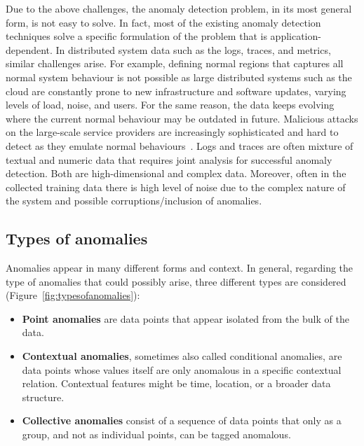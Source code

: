 Due to the above challenges, the anomaly detection problem, in its most general form, is not easy to solve. In fact, most of the existing anomaly detection techniques solve a specific formulation of the problem that is application-dependent. In distributed system data such as the logs, traces, and metrics, similar challenges arise. For example, defining normal regions that captures all normal system behaviour is not possible as large distributed systems such as the cloud are constantly prone to new infrastructure and software updates, varying levels of load, noise, and users. For the same reason, the data keeps evolving where the current normal behaviour may be outdated in future. Malicious attacks on the large-scale service providers are increasingly sophisticated and hard to detect as they emulate normal behaviours~\cite{yan2015software}. Logs and traces are often mixture of textual and numeric data that requires joint analysis for successful anomaly detection. Both are high-dimensional and complex data. Moreover, often in the collected training data there is high level of noise due to the complex nature of the system and possible corruptions/inclusion of anomalies. 

\subsection{Types of anomalies}

Anomalies appear in many different forms and context. In general, regarding the type of anomalies that could possibly arise, three different types are considered (Figure~\ref{fig:typesofanomalies}):
\begin{itemize}
    \item \textbf{Point anomalies} are data points that appear isolated from the bulk of the data.
    \item \textbf{Contextual anomalies}, sometimes also called conditional anomalies, are data points whose values itself are only anomalous in a specific contextual relation. Contextual features might be time, location, or a broader data structure.
    \item \textbf{Collective anomalies} consist of a sequence of data points that only as a group, and not as individual points, can be tagged anomalous.
\end{itemize}

